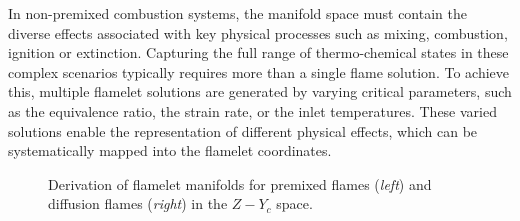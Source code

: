 \documentclass[preprint,12pt,authoryear]{elsarticle}
\begin{document}




In non-premixed combustion systems, the manifold space must contain the diverse effects associated with key physical processes such as mixing, combustion, ignition or extinction. Capturing the full range of thermo-chemical states in these complex scenarios typically requires more than a single flame solution. To achieve this, multiple flamelet solutions are generated by varying critical parameters, such as the equivalence ratio, the strain rate, or the inlet temperatures. These varied solutions enable the representation of different physical effects, which can be systematically mapped into the flamelet coordinates.


\begin{figure}[h!]
	\centering
	\caption{Derivation of flamelet manifolds for premixed flames (\textsl{left}) and diffusion flames (\textsl{right}) in the $Z - Y_c$ space.}
	\label{fig:flamelets_mapping_Z_Yc}
\end{figure}
\end{document}
